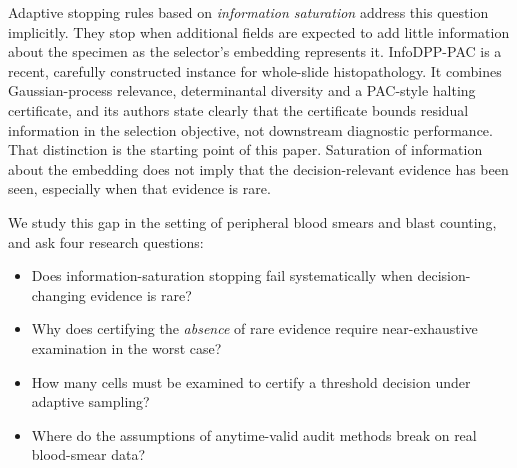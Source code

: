 \documentclass[11pt]{article}
\theoremstyle{remark}
\theoremstyle{definition}
\begin{document}
Adaptive stopping rules based on \emph{information saturation} address this question implicitly. They stop when additional fields are expected to add little information about the specimen as the selector's embedding represents it. InfoDPP-PAC \cite{mittal2026infodpp} is a recent, carefully constructed instance for whole-slide histopathology. It combines Gaussian-process relevance, determinantal diversity and a PAC-style halting certificate, and its authors state clearly that the certificate bounds residual information in the selection objective, not downstream diagnostic performance. That distinction is the starting point of this paper. Saturation of information about the embedding does not imply that the decision-relevant evidence has been seen, especially when that evidence is rare.

We study this gap in the setting of peripheral blood smears and blast counting, and ask four research questions:
\begin{itemize}
\item[\textbf{RQ1}] Does information-saturation stopping fail systematically when decision-changing evidence is rare?
\item[\textbf{RQ2}] Why does certifying the \emph{absence} of rare evidence require near-exhaustive examination in the worst case?
\item[\textbf{RQ3}] How many cells must be examined to certify a threshold decision under adaptive sampling?
\item[\textbf{RQ4}] Where do the assumptions of anytime-valid audit methods break on real blood-smear data?
\end{itemize}
\end{document}
